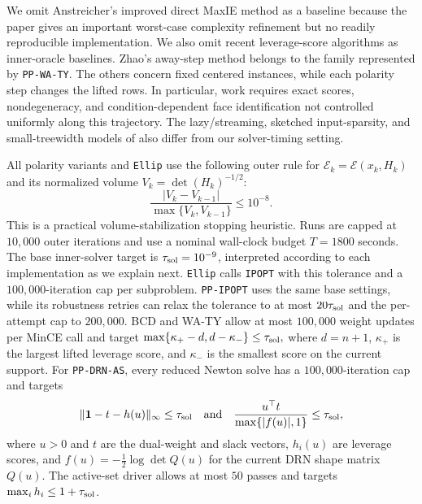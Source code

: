 \documentclass[smallextended]{svjour3}
\newcommand{\E}{\mathcal{E}}
\begin{document}
We omit Anstreicher's improved direct MaxIE method
\cite{anstreicher2002improved} as a baseline because the paper gives an
important worst-case complexity refinement but no readily reproducible
implementation. We also omit recent leverage-score algorithms as inner-oracle
baselines. Zhao's away-step method \cite{Zhao2025AwayStep} belongs to the family represented by
\texttt{PP-WA-TY}. The others concern fixed centered
instances, while each polarity step changes the lifted rows. In particular, work
\cite{LiYuJiangGaoHan2026} requires exact scores, nondegeneracy, and
condition-dependent face identification not controlled uniformly along this
trajectory. The lazy/streaming, sketched input-sparsity, and small-treewidth
models of \cite{WoodruffYasuda2024,CaoLiSongYangZhou2025} also differ from our
solver-timing setting.


All polarity variants and \texttt{Ellip} use the following outer rule for
$\mathcal{E}_k=\E(x_k,H_k)$ and its normalized volume
$V_k=\det(H_k)^{-1/2}$:
\[
    \frac{|V_k-V_{k-1}|}{\max\{V_k,V_{k-1}\}} \le 10^{-8}.
\]
This is a practical volume-stabilization stopping heuristic. Runs are capped
at $10,000$ outer iterations and use a nominal wall-clock budget
$T=1800$ seconds.
The base inner-solver target is $\tau_{\rm sol}=10^{-9}$, interpreted according
to each implementation as we explain next. \texttt{Ellip} calls \texttt{IPOPT} with this tolerance
and a $100,000$-iteration cap per subproblem. \texttt{PP-IPOPT} uses the same
base settings, while its robustness retries can relax the tolerance to at most
$20\tau_{\rm sol}$ and the per-attempt cap to $200,000$. BCD and WA-TY allow
at most $100,000$ weight updates per MinCE call and target $ \max\{\kappa_+-d,d-\kappa_-\}\le \tau_{\rm sol},$
where $d=n+1$, $\kappa_+$ is the largest lifted leverage score, and
$\kappa_-$ is the smallest score on the current support. For
\texttt{PP-DRN-AS}, every reduced Newton solve has a $100,000$-iteration cap
and targets
\[
    \|{\bf 1}-t-h(u)\|_\infty \le \tau_{\rm sol}
    \quad\text{and}\quad
    \frac{u^\top t}{\max\{|f(u)|,1\}} \le \tau_{\rm sol},
\]
where $u>0$ and $t$ are the dual-weight and slack vectors, $h_i(u)$ are leverage
scores, and $f(u)=-\tfrac12\log\det Q(u)$ for the current DRN shape matrix $Q(u)$. The
active-set driver allows at most $50$ passes and targets
$\max_i h_i\le1+\tau_{\rm sol}$.
\end{document}
